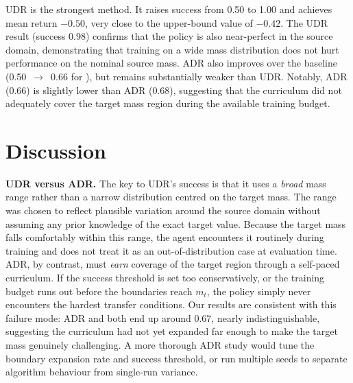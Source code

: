 \documentclass[10pt,twocolumn,letterpaper]{article}
\begin{document}
UDR is the strongest method. It raises \sourcetarget success from 0.50 to 1.00 and achieves mean return $-0.50$, very close to the upper-bound value of $-0.42$. The UDR \sourcesource result (success 0.98) confirms that the policy is also near-perfect in the source domain, demonstrating that training on a wide mass distribution does not hurt performance on the nominal source mass. ADR also improves over the baseline (0.50~$\to$~0.66 for \sourcetarget), but remains substantially weaker than UDR. Notably, ADR \sourcetarget (0.66) is slightly lower than ADR \sourcesource (0.68), suggesting that the curriculum did not adequately cover the target mass region during the available training budget.

\section{Discussion}
\label{sec:disc}

\textbf{UDR versus ADR.}
The key to UDR's success is that it uses a \emph{broad} mass range rather than a narrow distribution centred on the target mass. The range was chosen to reflect plausible variation around the source domain without assuming any prior knowledge of the exact target value. Because the target mass falls comfortably within this range, the agent encounters it routinely during training and does not treat it as an out-of-distribution case at evaluation time. ADR, by contrast, must \emph{earn} coverage of the target region through a self-paced curriculum. If the success threshold is set too conservatively, or the training budget runs out before the boundaries reach $m_t$, the policy simply never encounters the hardest transfer conditions. Our results are consistent with this failure mode: ADR \sourcesource and \sourcetarget both end up around 0.67, nearly indistinguishable, suggesting the curriculum had not yet expanded far enough to make the target mass genuinely challenging. A more thorough ADR study would tune the boundary expansion rate and success threshold, or run multiple seeds to separate algorithm behaviour from single-run variance.
\end{document}
